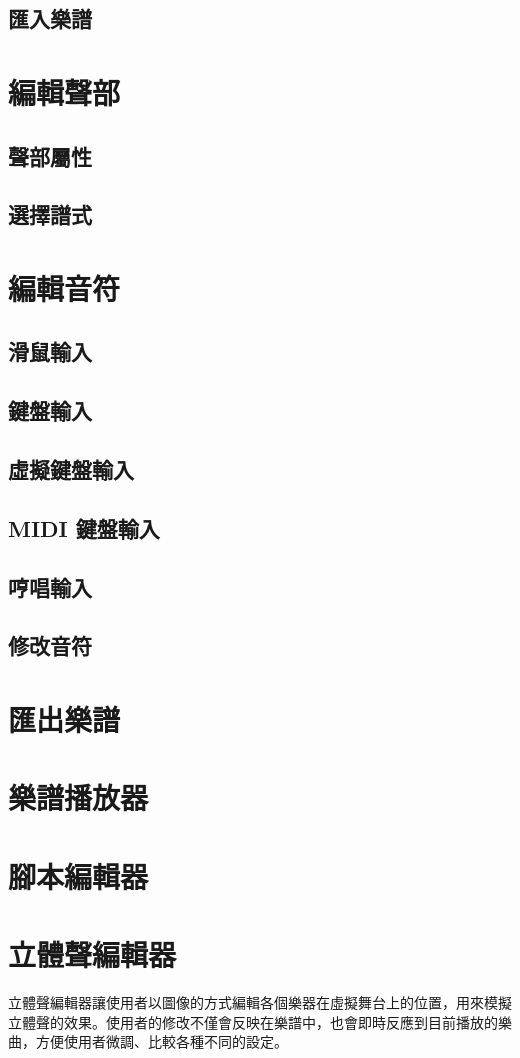 \documentclass[12pt,a4paper,oneside]{report}
\begin{document}
   \subsection{匯入樂譜}
\section{編輯聲部}
   \subsection{聲部屬性}
   \subsection{選擇譜式}
\section{編輯音符}
   \subsection{滑鼠輸入}
   \subsection{鍵盤輸入}
   \subsection{虛擬鍵盤輸入}
   \subsection{MIDI 鍵盤輸入}
   \subsection{哼唱輸入}
   \subsection{修改音符}
\section{匯出樂譜}
\section{樂譜播放器}
\section{腳本編輯器}
\section{立體聲編輯器}
立體聲編輯器讓使用者以圖像的方式編輯各個樂器在虛擬舞台上的位置，用來模擬立體聲的效果。使用者的修改不僅會反映在樂譜中，也會即時反應到目前播放的樂曲，方便使用者微調、比較各種不同的設定。
\end{document}
